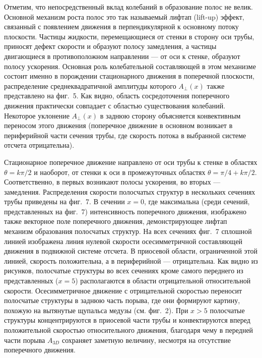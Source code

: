 Отметим, что непосредственный вклад колебаний в образование полос не велик. Основной механизм роста полос это так называемый лифтап (lift-up) эффект, связанный с появлением движения в перпендикулярной к основному потоку плоскости. Частицы жидкости, перемещающиеся от стенки в сторону оси трубы, приносят дефект скорости и образуют полосу замедления, а частицы двигающиеся в противоположном направлении --- от оси к стенке, образуют полосу ускорения. Основная роль колебательной составляющей в этом механизме состоит именно в порождении стационарного движения в поперечной плоскости, распределение среднеквадратичной амплитуды которого $A_\bot(x)$ также представлено на фиг.~5. Как видно, область сосредоточения поперечного движения практически совпадает с областью существования колебаний. Некоторое уклонение $A_\bot(x)$ в заднюю сторону объясняется конвективным переносом этого движения (поперечное движение в основном возникает в периферийной части сечения трубы, где скорость потока в выбранной системе отсчета отрицательна).

Стационарное поперечное движение направлено от оси трубы к стенке в областях $\theta=k\pi/2$ и наоборот, от стенки к оси в промежуточных областях $\theta=\pi/4+k\pi/2$. Соответственно, в первых возникают полосы ускорения, во вторых --- замедления. Распределения скорости полосчатых структур в нескольких сечениях трубы приведены на фиг.~7. В сечении $x=0$, где максимальна (среди сечений, представленных на фиг.~7) интенсивность поперечного движения, изображено также векторное поле поперечного движения, демонстрирующее лифтап механизм образования полосчатых структур. На всех сечениях фиг.~7 сплошной линией изображена линия нулевой скорости осесимметричной составляющей движения в подвижной системе отсчета. В приосевой области, ограниченной этой линией, скорость положительна, а в периферийной --- отрицательна. Как видно из рисунков, полосчатые структуры во всех сечениях кроме самого переднего из представленных ($x=5$) располагаются в области отрицательной относительной скорости. Осесимметричное движение с отрицательной скоростью переносит полосчатые структуры в заднюю часть порыва, где они формируют картину, похожую на вытянутые щупальса медузы (см. фиг.~2). При $x>5$ полосчатые структуры концентрируются в приосевой части трубы и конвектируются вперед положительной скоростью относительного движения, благодаря чему в передней части порыва $A_{3D}$ сохраняет заметную величину, несмотря на отсутствие поперечного движения.

